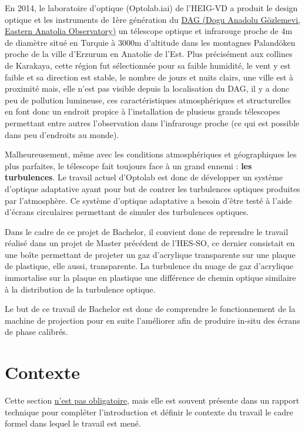 
En 2014, le laboratoire d'optique (Optolab.iai) de l'HEIG-VD a produit le design optique et les instruments de 1ère génération du \href{https://atasam.atauni.edu.tr/}{DAG (Dogu Anadolu Gözlemevi, Eastern Anatolia Observatory)}\footnotemark
un télescope optique et infrarouge proche de 4m de diamètre situé en Turquie à 3000m d'altitude dans les montagnes Palandöken proche de la ville d'Erzurum en Anatolie de l'Est. Plus précisément aux collines de Karakaya, cette région fut sélectionnée pour sa faible humidité, le vent y est faible et sa direction est stable,
le nombre de jours et nuits clairs, une ville est à proximité mais, elle n'est pas visible depuis la localisation du DAG, il y a donc peu de pollution lumineuse, ces caractéristiques atmosphériques et structurelles en font donc un endroit propice à l'installation de plusieus grands télescopes permettant entre autres l'observation
dans l'infrarouge proche (ce qui est possible dans peu d'endroits au monde).

Malheureusement, même avec les conditions atmosphériques et géographiques les plus parfaites, le télescope fait toujours face à un grand ennemi : \textbf{les turbulences}.
Le travail actuel d'Optolab est donc de développer un système d'optique adaptative ayant pour but de contrer les turbulences optiques produites par l'atmosphère. Ce système
d'optique adaptative a besoin d'être testé à l'aide d'écrans circulaires permettant de simuler des turbulences optiques.

Dans le cadre de ce projet de Bachelor, il convient donc de reprendre le travail réalisé dans un projet de Master précédent de l'HES-SO, ce dernier consistait en une boîte permettant de projeter un gaz d'acrylique transparente sur une plaque de plastique, elle aussi, transparente. La turbulence du nuage de gaz
d'acrylique immortalise sur la plaque en plastique une différence de chemin optique similaire à la distribution de la turbulence optique.

Le but de ce travail de Bachelor est donc de comprendre le fonctionnement de la machine de projection pour en suite l'améliorer afin de produire in-situ des écrans de phase calibrés.

\newpage


\section{Contexte}
Cette section \underline{n'est pas obligatoire}, mais elle est souvent présente dans un rapport technique pour compléter l'introduction et définir le contexte du travail \cad le cadre formel dans lequel le travail est mené.


